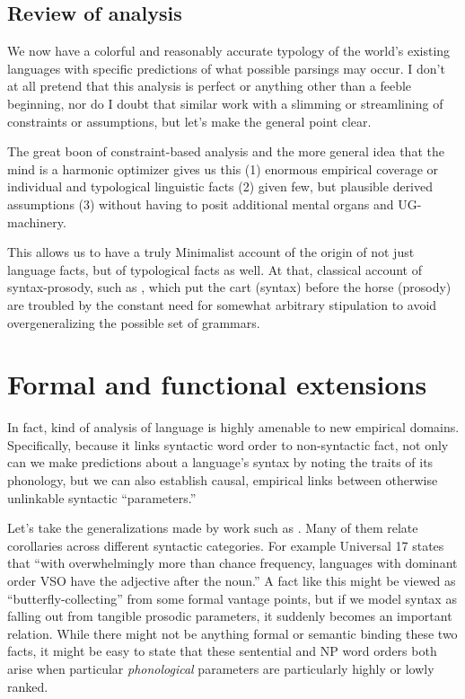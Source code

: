 \documentclass{article}
\begin{document}
\subsection{Review of analysis}

We now have a colorful and reasonably accurate typology of the world's existing languages with specific predictions of what possible parsings may occur.
I don't at all pretend that this analysis is perfect or anything other than a feeble beginning, nor do I doubt that similar work with a slimming or streamlining of constraints or assumptions, but let's make the general point clear.

The great boon of constraint-based analysis and the more general idea that the mind is a harmonic optimizer gives us this (1) enormous empirical coverage or individual and typological linguistic facts (2) given few, but plausible derived assumptions (3) without having to posit additional mental organs and UG-machinery.

This allows us to have a truly Minimalist account of the origin of not just language facts, but of typological facts as well.
At that, classical account of syntax-prosody, such as \parencite{halle87}, which put the cart (syntax) before the horse (prosody) are troubled by the constant need for somewhat arbitrary stipulation to avoid overgeneralizing the possible set of grammars.

\section{Formal and functional extensions\label{exten}}

In fact, kind of analysis of language is highly amenable to new empirical domains.
Specifically, because it links syntactic word order to non-syntactic fact, not only can we make predictions about a language's syntax by noting the traits of its phonology, but we can also establish causal, empirical links between otherwise unlinkable syntactic ``parameters.''

Let's take the generalizations made by work such as \textcite{greenberg63}.
Many of them relate corollaries across different syntactic categories.
For example Universal 17 states that ``with overwhelmingly more than chance frequency, languages with dominant order VSO have the adjective after the noun.''
A fact like this might be viewed as ``butterfly-collecting'' from some formal vantage points, but if we model syntax as falling out from tangible prosodic parameters, it suddenly becomes an important relation.
While there might not be anything formal or semantic binding these two facts, it might be easy to state that these sentential and NP word orders both arise when particular \textit{phonological} parameters are particularly highly or lowly ranked.
\end{document}
